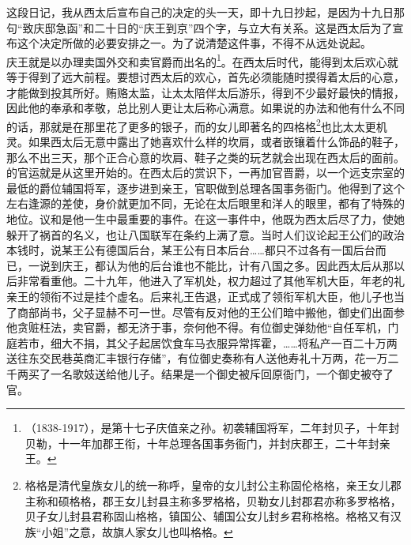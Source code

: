 这段日记，我从西太后宣布自己的决定的头一天，即十九日抄起，是因为十九日那句“致庆邸急函”和二十日的“庆王到京”四个字，与立大有关系。这是西太后为了宣布这个决定所做的必要安排之一。为了说清楚这件事，不得不从远处说起。\\

庆王就是以办理卖国外交和卖官爵而出名的\footnote{（1838-1917），是第十七子庆值亲之孙。初袭辅国将军，二年封贝子，十年封贝勒，十一年加郡王衔，十年总理各国事务衙门，并封庆郡王，二十年封亲王。}。在西太后时代，能得到太后欢心就等于得到了远大前程。要想讨西太后的欢心，首先必须能随时摸得着太后的心意，才能做到投其所好。贿赂太监，让太太陪伴太后游乐，得到不少最好最快的情报，因此他的奉承和孝敬，总比别人更让太后称心满意。如果说的办法和他有什么不同的话，那就是在那里花了更多的银子，而的女儿即著名的四格格\footnote{格格是清代皇族女儿的统一称呼，皇帝的女儿封公主称固伦格格，亲王女儿郡主称和硕格格，郡王女儿封县主称多罗格格，贝勒女儿封郡君亦称多罗格格，贝子女儿封县君称固山格格，镇国公、辅国公女儿封乡君称格格。格格又有汉族“小姐”之意，故旗人家女儿也叫格格。}也比太太更机灵。如果西太后无意中露出了她喜欢什么样的坎肩，或者嵌镶着什么饰品的鞋子，那么不出三天，那个正合心意的坎肩、鞋子之类的玩艺就会出现在西太后的面前。的官运就是从这里开始的。在西太后的赏识下，一再加官晋爵，以一个远支宗室的最低的爵位辅国将军，逐步进到亲王，官职做到总理各国事务衙门。他得到了这个左右逢源的差使，身价就更加不同，无论在太后眼里和洋人的眼里，都有了特殊的地位。议和是他一生中最重要的事件。在这一事件中，他既为西太后尽了力，使她躲开了祸首的名义，也让八国联军在条约上满了意。当时人们议论起王公们的政治本钱时，说某王公有德国后台，某王公有日本后台……都只不过各有一国后台而已，一说到庆王，都认为他的后台谁也不能比，计有八国之多。因此西太后从那以后非常看重他。二十九年，他进入了军机处，权力超过了其他军机大臣，年老的礼亲王的领衔不过是挂个虚名。后来礼王告退，正式成了领衔军机大臣，他儿子也当了商部尚书，父子显赫不可一世。尽管有反对他的王公们暗中搬他，御史们出面参他贪赃枉法，卖官爵，都无济于事，奈何他不得。有位御史弹劾他“自任军机，门庭若市，细大不捐，其父子起居饮食车马衣服异常挥霍，……将私产一百二十万两送往东交民巷英商汇丰银行存储”，有位御史奏称有人送他寿礼十万两，花一万二千两买了一名歌妓送给他儿子。结果是一个御史被斥回原衙门，一个御史被夺了官。\\

